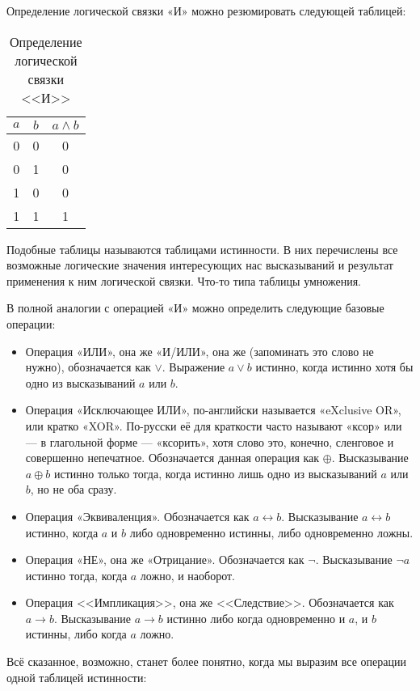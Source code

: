Определение логической связки «И» можно резюмировать следующей таблицей:

\begin{table}[h]
\centering
\begin{tabular}{c c | c}
$a$ & $b$ & $a \land b$ \\
\hline
0 & 0 & 0 \\
0 & 1 & 0 \\
1 & 0 & 0 \\
1 & 1 & 1
\end{tabular}
\caption{Определение логической связки <<И>>}\label{table:logic-and}
\end{table}


Подобные таблицы называются таблицами истинности. В них перечислены все возможные логические значения интересующих нас высказываний и результат применения к ним логической связки. Что-то типа таблицы умножения.

В полной аналогии с операцией «И» можно определить следующие базовые операции:

\begin{itemize}
\item Операция «ИЛИ», она же «И/ИЛИ», она же  (запоминать это слово не нужно), обозначается как $\lor$. Выражение $a\lor b$ истинно, когда истинно хотя бы одно из высказываний $a$ или $b$.
\item Операция «Исключающее ИЛИ», по-английски называется «eXclusive OR», или кратко «XOR». По-русски её для краткости часто называют «ксор» или --- в глагольной форме --- «ксорить», хотя слово это, конечно, сленговое и совершенно непечатное. Обозначается данная операция как $\oplus$. Высказывание $a \oplus b$ истинно только тогда, когда истинно лишь одно из высказываний $a$ или $b$, но не оба сразу.
\item Операция «Эквиваленция». Обозначается как $a \leftrightarrow b$. Высказывание $a \leftrightarrow b$ истинно, когда $a$ и $b$ либо одновременно истинны, либо одновременно ложны.
\item Операция «НЕ», она же «Отрицание». Обозначается как $\neg$. Высказывание $\neg a$ истинно тогда, когда $a$ ложно, и наоборот.
\item Операция <<Импликация>>, она же <<Следствие>>. Обозначается как $a \to b$. Высказывание $a \to b$ истинно либо когда одновременно и $a$, и $b$ истинны, либо когда $a$ ложно.
\end{itemize}

Всё сказанное, возможно, станет более понятно, когда мы выразим все операции одной таблицей истинности:

